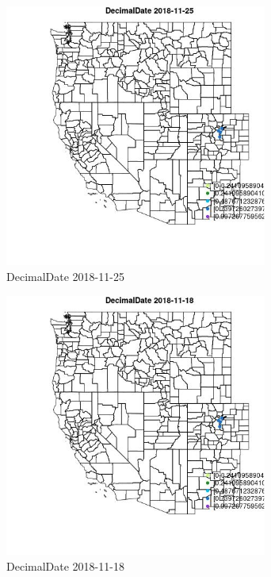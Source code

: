 \begin{figure} 
\centering  
\includegraphics[width=0.77\textwidth]{Code_Outputs/Report_ML_input_PM25_Step4_part_e_de_duplicated_aveswNAs_MapObsDecimalDate2018-11-25.jpg} 
\caption{\label{fig:Report_ML_input_PM25_Step4_part_e_de_duplicated_aveswNAsMapObsDecimalDate2018-11-25}DecimalDate 2018-11-25} 
\end{figure} 
 

\begin{figure} 
\centering  
\includegraphics[width=0.77\textwidth]{Code_Outputs/Report_ML_input_PM25_Step4_part_e_de_duplicated_aveswNAs_MapObsDecimalDate2018-11-18.jpg} 
\caption{\label{fig:Report_ML_input_PM25_Step4_part_e_de_duplicated_aveswNAsMapObsDecimalDate2018-11-18}DecimalDate 2018-11-18} 
\end{figure} 
 
